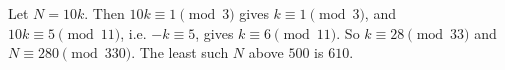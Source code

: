 Let $N=10k$. Then $10k\equiv1\pmod3$ gives $k\equiv1\pmod3$, and $10k\equiv5\pmod{11}$, i.e. $-k\equiv5$, gives $k\equiv6\pmod{11}$. So $k\equiv28\pmod{33}$ and $N\equiv280\pmod{330}$. The least such $N$ above $500$ is $\boxed{610}$.
